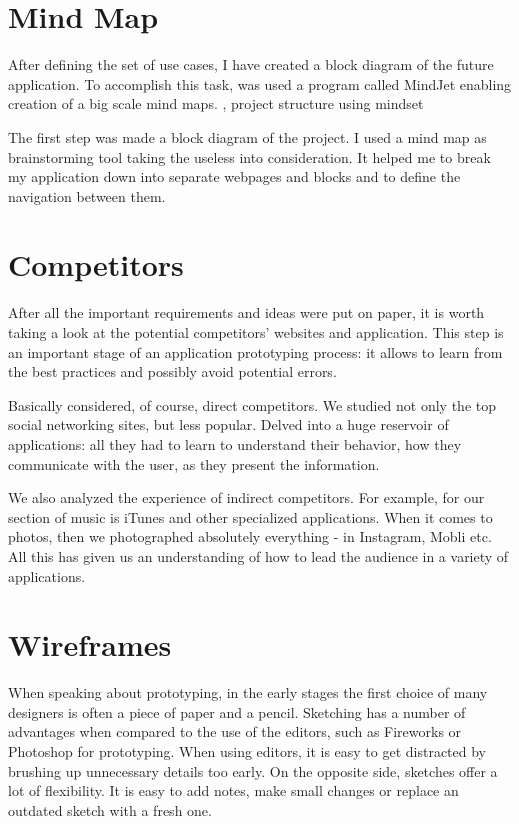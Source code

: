 \section{Mind Map}
\label{sec:mind map}
After defining the set of use cases, I have created a block diagram of the future application. To accomplish this task, was used a program called MindJet enabling creation of a big scale mind maps. , project structure using mindset 

The first step was made a block diagram of the project. I used a mind map as brainstorming tool taking the useless into consideration. It helped me to break my application down into separate webpages and blocks and to define the navigation between them. 

\section{Competitors}
\label{sec:designcompetitors}
After all the important requirements and ideas were put on paper, it is worth taking a look at the potential competitors’ websites and application. This step is an important stage of an application prototyping process: it allows to learn from the best practices and possibly avoid potential errors.

Basically considered, of course, direct competitors. We studied not only the top social networking sites, but less popular. Delved into a huge reservoir of applications: all they had to learn to understand their behavior, how they communicate with the user, as they present the information.

We also analyzed the experience of indirect competitors. For example, for our section of music is iTunes and other specialized applications. When it comes to photos, then we photographed absolutely everything - in Instagram, Mobli etc. All this has given us an understanding of how to lead the audience in a variety of applications.

\section{Wireframes}
\label{sec:wireframes}
When speaking about prototyping, in the early stages the first choice of many designers is often a piece of paper and a pencil. Sketching has a number of advantages when compared to the use of the editors, such as Fireworks or Photoshop for prototyping. When using editors, it is easy to get distracted by brushing up unnecessary details too early. On the opposite side, sketches offer a lot of flexibility. It is easy to add notes, make small changes or replace an outdated sketch with a fresh one.

